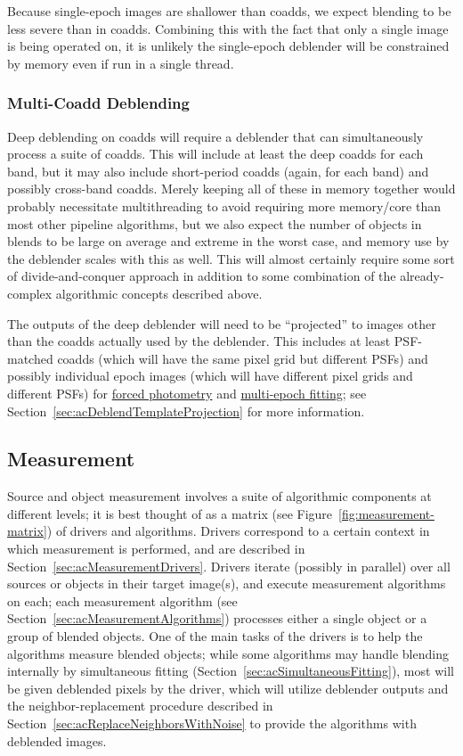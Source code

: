Because single-epoch images are shallower than coadds, we expect blending to be less severe than in coadds.  Combining this with the fact that only a single image is being operated on, it is unlikely the single-epoch deblender will be constrained by memory even if run in a single thread.

\subsubsection{Multi-Coadd Deblending}
\label{sec:acMultiCoaddDeblending}

Deep deblending on coadds will require a deblender that can simultaneously process a suite of coadds.  This will include at least the deep coadds for each band, but it may also include short-period coadds (again, for each band) and possibly cross-band coadds.  Merely keeping all of these in memory together would probably necessitate multithreading to avoid requiring more memory/core than most other pipeline algorithms, but we also expect the number of objects in blends to be large on average and extreme in the worst case, and memory use by the deblender scales with this as well.  This will almost certainly require some sort of divide-and-conquer approach in addition to some combination of the already-complex algorithmic concepts described above.

The outputs of the deep deblender will need to be ``projected'' to images other than the coadds actually used by the deblender.  This includes at least PSF-matched coadds (which will have the same pixel grid but different PSFs) and possibly individual epoch images (which will have different pixel grids and different PSFs) for \hyperref[sec:drpForcedPhotometry]{forced photometry} and \hyperref[sec:drpMultiFit]{multi-epoch fitting}; see Section~\ref{sec:acDeblendTemplateProjection} for more information.

\subsection{Measurement}
\label{sec:acMeasurement}

Source and object measurement involves a suite of algorithmic components at different levels; it is best thought of as a matrix (see Figure~\ref{fig:measurement-matrix}) of drivers and algorithms.  Drivers correspond to a certain context in which measurement is performed, and are described in Section~\ref{sec:acMeasurementDrivers}.  Drivers iterate (possibly in parallel) over all sources or objects in their target image(s), and execute measurement algorithms on each; each measurement algorithm (see Section~\ref{sec:acMeasurementAlgorithms}) processes either a single object or a group of blended objects.  One of the main tasks of the drivers is to help the algorithms measure blended objects; while some algorithms may handle blending internally by simultaneous fitting (Section~\ref{sec:acSimultaneousFitting}), most will be given deblended pixels by the driver, which will utilize deblender outputs and the neighbor-replacement procedure described in Section~\ref{sec:acReplaceNeighborsWithNoise} to provide the algorithms with deblended images.


